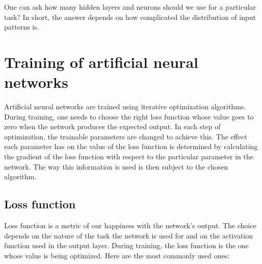 One can ask how many hidden layers and neurons should we use for a particular task? In short, the answer depends on how complicated the distribution of input patterns is.








\section{Training of artificial neural networks}

Artificial neural networks are trained using iterative optimization algorithms. During training, one needs to choose the right loss function whose value goes to zero when the network produces the expected output. In each step of optimization, the trainable parameters are changed to achieve this. The effect each parameter has on the value of the loss function is determined by calculating the gradient of the loss function with respect to the particular parameter in the network. The way this information is used is then subject to the chosen algorithm. 

\subsection{Loss function}

Loss function is a metric of our happiness with the network's output. The choice depends on the nature of the task the network is used for and on the activation function used in the output layer. During training, the loss function is the one whose value is being optimized. Here are the most commonly used ones:

